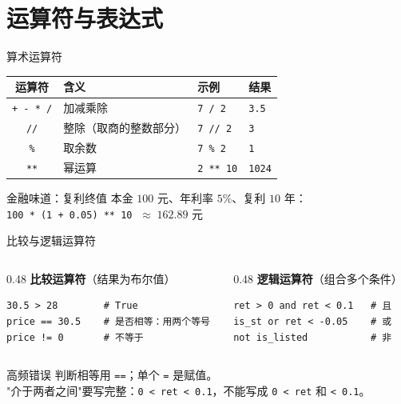 \documentclass[9pt]{ctexbeamer}
\begin{document}
\section{运算符与表达式}

\begin{frame}{算术运算符}
	\begin{table}
		\centering
		\begin{tabular}{clll}
			\toprule
			运算符 & 含义 & 示例 & 结果 \\
			\midrule
			\texttt{+ - * /} & 加减乘除 & \texttt{7 / 2} & \texttt{3.5} \\
			\texttt{//} & 整除（取商的整数部分） & \texttt{7 // 2} & \texttt{3} \\
			\texttt{\%} & 取余数 & \texttt{7 \% 2} & \texttt{1} \\
			\texttt{**} & 幂运算 & \texttt{2 ** 10} & \texttt{1024} \\
			\bottomrule
		\end{tabular}
	\end{table}
	\begin{exampleblock}{金融味道：复利终值}
		本金 $100$ 元、年利率 $5\%$、复利 $10$ 年：\\[2pt]
		\centering
		\texttt{100 * (1 + 0.05) ** 10} $\;\approx\; 162.89$ 元
	\end{exampleblock}
\end{frame}

\begin{frame}[fragile]{比较与逻辑运算符}
	\begin{columns}[T,totalwidth=\textwidth]
		\begin{column}{0.48\textwidth}
			\textbf{比较运算符}（结果为布尔值）
			\begin{lstlisting}
30.5 > 28        # True
price == 30.5    # 是否相等：用两个等号
price != 0       # 不等于
\end{lstlisting}
	\end{column}
	\begin{column}{0.48\textwidth}
			\textbf{逻辑运算符}（组合多个条件）
			\begin{lstlisting}
ret > 0 and ret < 0.1   # 且
is_st or ret < -0.05    # 或
not is_listed           # 非
\end{lstlisting}
	\end{column}
	\end{columns}
	\vspace{0.5em}
	\begin{alertblock}{高频错误}
		判断相等用 \texttt{==}；单个 \texttt{=} 是赋值。\\
		"介于两者之间"要写完整：\texttt{0 < ret < 0.1}，不能写成 \texttt{0 < ret} 和 \texttt{< 0.1}。
	\end{alertblock}
\end{frame}
\end{document}
